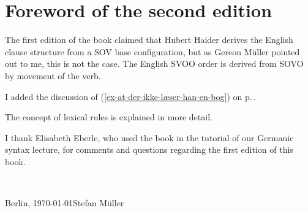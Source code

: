 \section*{Foreword of the second edition}



The first edition of the book claimed that Hubert Haider derives the English clause structure from a
SOV base configuration, but as Gereon Müller pointed out to me, this is not the case. The English
SVOO order is derived from SOVO by movement of the verb.

I added the discussion of (\ref{ex-at-der-ikke-læser-han-en-bog}) on
p.\,\pageref{ex-at-der-ikke-læser-han-en-bog}.

The concept of lexical rules is explained in more detail.

I thank Elisabeth Eberle, who used the book in the tutorial of our Germanic syntax lecture, for comments and questions regarding the first edition of this book.

~\medskip

\noindent
Berlin, \today\hfill Stefan Müller

